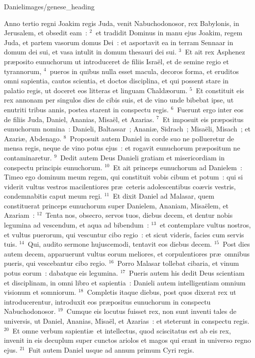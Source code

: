 {Daniel}{images/genese_heading}


\bchapter
\lettrine[lines=6,image=true,loversize=0.05,lraise=-0.03]{A}{}nno tertio regni Joakim regis Juda, venit Nabuchodonosor, rex Babylonis, in Jerusalem, et obsedit eam~:
${}^{2}$~et tradidit Dominus in manu ejus Joakim, regem Juda, et partem vasorum domus Dei~: et asportavit ea in terram Sennaar in domum dei sui, et vasa intulit in domum thesauri dei sui.
${}^{3}$~Et ait rex Asphenez pr\ae posito eunuchorum ut introduceret de filiis Isra\"el, et de semine regio et tyrannorum,
${}^{4}$~pueros in quibus nulla esset macula, decoros forma, et eruditos omni sapientia, cautos scientia, et doctos disciplina, et qui possent stare in palatio regis, ut doceret eos litteras et linguam Chald\ae orum.
${}^{5}$~Et constituit eis rex annonam per singulos dies de cibis suis, et de vino unde bibebat ipse, ut enutriti tribus annis, postea starent in conspectu regis.
${}^{6}$~Fuerunt ergo inter eos de filiis Juda, Daniel, Ananias, Misa\"el, et Azarias.
${}^{7}$~Et imposuit eis pr\ae positus eunuchorum nomina~: Danieli, Baltassar~; Anani\ae , Sidrach~; Misa\"eli, Misach~; et Azari\ae , Abdenago.
${}^{8}$~Proposuit autem Daniel in corde suo ne pollueretur de mensa regis, neque de vino potus ejus~: et rogavit eunuchorum pr\ae positum ne contaminaretur.
${}^{9}$~Dedit autem Deus Danieli gratiam et misericordiam in conspectu principis eunuchorum.
${}^{10}$~Et ait princeps eunuchorum ad Danielem~: Timeo ego dominum meum regem, qui constituit vobis cibum et potum~: qui si viderit vultus vestros macilentiores pr\ae\ ceteris adolescentibus co\ae vis vestris, condemnabitis caput meum regi.
${}^{11}$~Et dixit Daniel ad Malasar, quem constituerat princeps eunuchorum super Danielem, Ananiam, Misa\"elem, et Azariam~:
${}^{12}$~Tenta nos, obsecro, servos tuos, diebus decem, et dentur nobis legumina ad vescendum, et aqua ad bibendum~:
${}^{13}$~et contemplare vultus nostros, et vultus puerorum, qui vescuntur cibo regio~: et sicut videris, facies cum servis tuis.
${}^{14}$~Qui, audito sermone hujuscemodi, tentavit eos diebus decem.
${}^{15}$~Post dies autem decem, apparuerunt vultus eorum meliores, et corpulentiores pr\ae\ omnibus pueris, qui vescebantur cibo regio.
${}^{16}$~Porro Malasar tollebat cibaria, et vinum potus eorum~: dabatque eis legumina.
${}^{17}$~Pueris autem his dedit Deus scientiam et disciplinam, in omni libro et sapientia~: Danieli autem intelligentiam omnium visionum et somniorum.
${}^{18}$~Completis itaque diebus, post quos dixerat rex ut introducerentur, introduxit eos pr\ae positus eunuchorum in conspectu Nabuchodonosor.
${}^{19}$~Cumque eis locutus fuisset rex, non sunt inventi tales de universis, ut Daniel, Ananias, Misa\"el, et Azarias~: et steterunt in conspectu regis.
${}^{20}$~Et omne verbum sapienti\ae\ et intellectus, quod sciscitatus est ab eis rex, invenit in eis decuplum super cunctos ariolos et magos qui erant in universo regno ejus.
${}^{21}$~Fuit autem Daniel usque ad annum primum Cyri regis.

